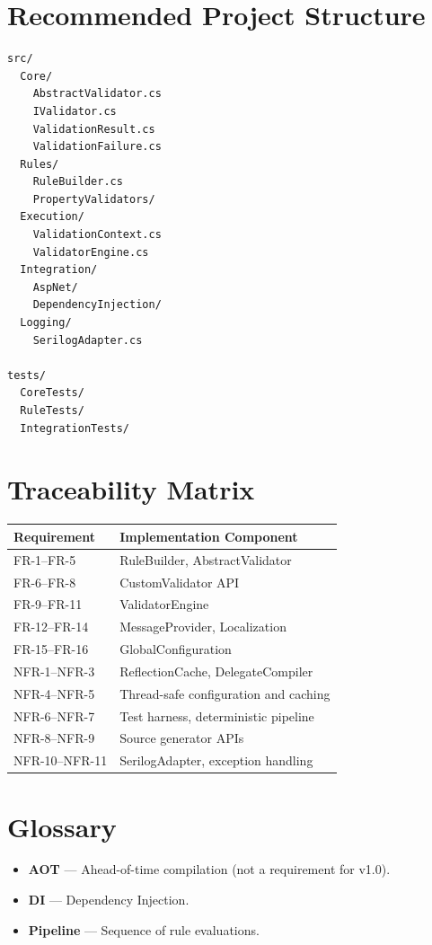 \documentclass[12pt,technote]{IEEEtran}
\begin{document}
\section{Recommended Project Structure}

\begin{verbatim}
src/
  Core/
    AbstractValidator.cs
    IValidator.cs
    ValidationResult.cs
    ValidationFailure.cs
  Rules/
    RuleBuilder.cs
    PropertyValidators/
  Execution/
    ValidationContext.cs
    ValidatorEngine.cs
  Integration/
    AspNet/
    DependencyInjection/
  Logging/
    SerilogAdapter.cs

tests/
  CoreTests/
  RuleTests/
  IntegrationTests/
\end{verbatim}

\section{Traceability Matrix}

\begin{longtable}{|p{3cm}|p{10cm}|}
\hline
\textbf{Requirement} & \textbf{Implementation Component} \\
\hline
FR-1--FR-5 & RuleBuilder, AbstractValidator \\
FR-6--FR-8 & CustomValidator API \\
FR-9--FR-11 & ValidatorEngine \\
FR-12--FR-14 & MessageProvider, Localization \\
FR-15--FR-16 & GlobalConfiguration \\
NFR-1--NFR-3 & ReflectionCache, DelegateCompiler \\
NFR-4--NFR-5 & Thread-safe configuration and caching \\
NFR-6--NFR-7 & Test harness, deterministic pipeline \\
NFR-8--NFR-9 & Source generator APIs \\
NFR-10--NFR-11 & SerilogAdapter, exception handling \\
\hline
\end{longtable}

\section{Glossary}
\begin{itemize}[noitemsep]
    \item \textbf{AOT} — Ahead-of-time compilation (not a requirement for v1.0).
    \item \textbf{DI} — Dependency Injection.
    \item \textbf{Pipeline} — Sequence of rule evaluations.
\end{itemize}
\end{document}
